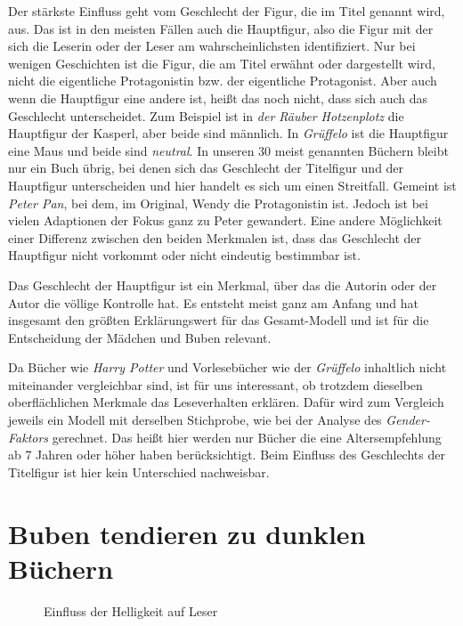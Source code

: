Der stärkste Einfluss geht vom Geschlecht der Figur, die im Titel
genannt wird, aus. Das ist in den meisten Fällen auch die Hauptfigur,
also die Figur mit der sich die Leserin oder der Leser am
wahrscheinlichsten identifiziert. Nur bei wenigen Geschichten ist die
Figur, die am Titel erwähnt oder dargestellt wird, nicht die eigentliche
Protagonistin bzw. der eigentliche Protagonist. Aber auch wenn die
Hauptfigur eine andere ist, heißt das noch nicht, dass sich auch das
Geschlecht unterscheidet. Zum Beispiel ist in \emph{der Räuber
Hotzenplotz} die Hauptfigur der Kasperl, aber beide sind männlich. In
\emph{Grüffelo} ist die Hauptfigur eine Maus und beide sind
\emph{neutral}. In unseren 30 meist genannten Büchern bleibt nur ein
Buch übrig, bei denen sich das Geschlecht der Titelfigur und der
Hauptfigur unterscheiden und hier handelt es sich um einen Streitfall.
Gemeint ist \emph{Peter Pan}, bei dem, im Original, Wendy die
Protagonistin ist. Jedoch ist bei vielen Adaptionen der Fokus ganz zu
Peter gewandert. Eine andere Möglichkeit einer Differenz zwischen den
beiden Merkmalen ist, dass das Geschlecht der Hauptfigur nicht vorkommt
oder nicht eindeutig bestimmbar ist.

Das Geschlecht der Hauptfigur ist ein Merkmal, über das die Autorin oder
der Autor die völlige Kontrolle hat. Es entsteht meist ganz am Anfang
und hat insgesamt den größten Erklärungswert für das Gesamt-Modell und
ist für die Entscheidung der Mädchen und Buben relevant.

Da Bücher wie \emph{Harry Potter} und Vorlesebücher wie der
\emph{Grüffelo} inhaltlich nicht miteinander vergleichbar sind, ist für
uns interessant, ob trotzdem dieselben oberflächlichen Merkmale das
Leseverhalten erklären. Dafür wird zum Vergleich jeweils ein Modell mit
derselben Stichprobe, wie bei der Analyse des \emph{Gender-Faktors}
gerechnet. Das heißt hier werden nur Bücher die eine Altersempfehlung ab
7 Jahren oder höher haben berücksichtigt. Beim Einfluss des Geschlechts
der Titelfigur ist hier kein Unterschied nachweisbar.

\section{Buben tendieren zu dunklen Büchern}

\begin{figure}
\center
  \label{helligkeit}
  \small

  \caption[Einfluss der Helligkeit auf Leser]{Einfluss der Helligkeit auf Leser}
\end{figure}

